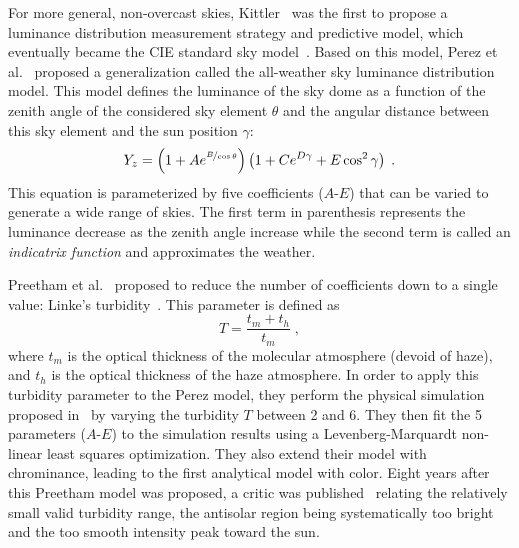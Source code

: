 
For more general, non-overcast skies, Kittler~\cite{kittler1985luminance} was the first to propose a luminance distribution measurement strategy and predictive model, which eventually became the CIE standard sky model~\cite{darula-cie-sky}. Based on this model, Perez et al.~\cite{perez1993allweather} proposed a generalization called the all-weather sky luminance distribution model. This model defines the luminance of the sky dome as a function of the zenith angle of the considered sky element $\theta$ and the angular distance between this sky element and the sun position $\gamma$:
\begin{equation}
Y_z = \left( 1 + A e^{\nicefrac{B}{\cos\theta}} \right)\left( 1 + C e^{D\gamma} + E \cos^2 \gamma \right) \;.
\end{equation}
This equation is parameterized by five coefficients ($A$-$E$) that can be varied to generate a wide range of skies. The first term in parenthesis represents the luminance decrease as the zenith angle increase while the second term is called an \emph{indicatrix function} and approximates the weather.

Preetham et al.~\cite{preetham-siggraph-99} proposed to reduce the number of coefficients down to a single value: Linke's turbidity~\cite{mccartney1976optics}. This parameter is defined as
\begin{equation}
T = \frac{t_m + t_h}{t_m} \;,
\end{equation}
where $t_m$ is the optical thickness of the molecular atmosphere (devoid of haze), and $t_h$ is the optical thickness of the haze atmosphere. In order to apply this turbidity parameter to the Perez model, they perform the physical simulation proposed in~\cite{nishita1996display} by varying the turbidity $T$ between 2 and 6. They then fit the 5 parameters ($A$-$E$) to the simulation results using a Levenberg-Marquardt non-linear least squares optimization. They also extend their model with chrominance, leading to the first analytical model with color. 
Eight years after this Preetham model was proposed, a critic was published~\cite{zotti2007critical} relating the relatively small valid turbidity range, the antisolar region being systematically too bright and the too smooth intensity peak toward the sun.

